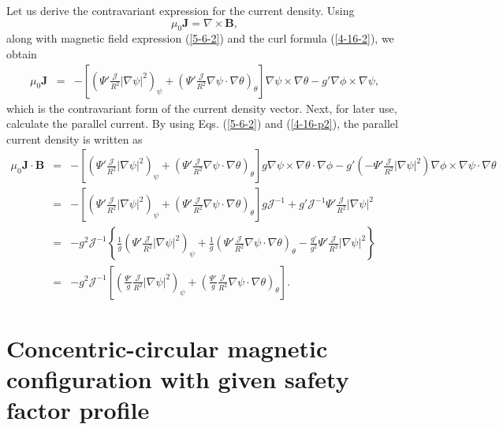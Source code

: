 \documentclass{article}
\begin{document}
Let us derive the contravariant expression for the current density. Using
\[ \mu_0 \mathbf{J}= \nabla \times \mathbf{B}, \]
along with magnetic field expression (\ref{5-6-2}) and the curl formula
(\ref{4-16-2}), we obtain
\begin{eqnarray}
  \mu_0 \mathbf{J} & = & - \left[ \left( \Psi' \frac{\mathcal{J}}{R^2} |
  \nabla \psi |^2 \right)_{\psi} + \left( \Psi' \frac{\mathcal{J}}{R^2} \nabla
  \psi \cdot \nabla \theta \right)_{\theta} \right] \nabla \psi \times \nabla
  \theta - g' \nabla \phi \times \nabla \psi,  \label{4-16-p2}
\end{eqnarray}
which is the contravariant form of the current density vector. Next, for later
use, calculate the parallel current. By using Eqs. (\ref{5-6-2}) and
(\ref{4-16-p2}), the parallel current density is written as
\begin{eqnarray}
  \mu_0 \mathbf{J} \cdot \mathbf{B} & = & - \left[ \left( \Psi'
  \frac{\mathcal{J}}{R^2} | \nabla \psi |^2 \right)_{\psi} + \left( \Psi'
  \frac{\mathcal{J}}{R^2} \nabla \psi \cdot \nabla \theta \right)_{\theta}
  \right] g \nabla \psi \times \nabla \theta \cdot \nabla \phi - g' \left( -
  \Psi' \frac{\mathcal{J}}{R^2} | \nabla \psi |^2 \right) \nabla \phi \times
  \nabla \psi \cdot \nabla \theta \nonumber\\
  & = & - \left[ \left( \Psi' \frac{\mathcal{J}}{R^2} | \nabla \psi |^2
  \right)_{\psi} + \left( \Psi' \frac{\mathcal{J}}{R^2} \nabla \psi \cdot
  \nabla \theta \right)_{\theta} \right] g\mathcal{J}^{- 1} + g'
  \mathcal{J}^{- 1} \Psi' \frac{\mathcal{J}}{R^2} | \nabla \psi |^2
  \nonumber\\
  & = & - g^2 \mathcal{J}^{- 1} \left\{ \frac{1}{g} \left( \Psi'
  \frac{\mathcal{J}}{R^2} | \nabla \psi |^2 \right)_{\psi} + \frac{1}{g}
  \left( \Psi' \frac{\mathcal{J}}{R^2} \nabla \psi \cdot \nabla \theta
  \right)_{\theta} - \frac{g'}{g^2} \Psi' \frac{\mathcal{J}}{R^2} | \nabla
  \psi |^2 \right\} \nonumber\\
  & = & - g^2 \mathcal{J}^{- 1} \left[ \left( \frac{\Psi'}{g}
  \frac{\mathcal{J}}{R^2} | \nabla \psi |^2 \right)_{\psi} + \left(
  \frac{\Psi'}{g} \frac{\mathcal{J}}{R^2} \nabla \psi \cdot \nabla \theta
  \right)_{\theta} \right] . 
\end{eqnarray}
\section{Concentric-circular magnetic configuration with given safety factor
profile}\label{19-4-8-p1}
\end{document}
